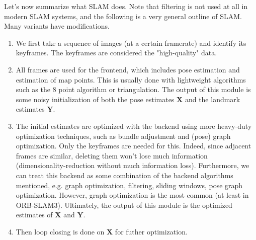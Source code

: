 \documentclass{article}
\newcounter{algo}[section]
\begin{document}
  Let's now summarize what SLAM does. Note that filtering is not used at all in modern SLAM systems, and the following is a very general outline of SLAM. Many variants have modifications. 
  \begin{enumerate}
      \item We first take a sequence of images (at a certain framerate) and identify its keyframes. The keyframes are considered the "high-quality" data. 
      \item All frames are used for the frontend, which includes pose estimation and estimation of map points. This is usually done with lightweight algorithms such as the 8 point algorithm or triangulation. The output of this module is some noisy initialization of both the pose estimates $\mathbf{X}$ and the landmark estimates $\mathbf{Y}$. 
      \item The initial estimates are optimized with the backend using more heavy-duty optimization techniques, such as bundle adjustment and (pose) graph optimization. Only the keyframes are needed for this. Indeed, since adjacent frames are similar, deleting them won't lose much information (dimensionality-reduction without much information loss). Furthermore, we can treat this backend as some combination of the backend algorithms mentioned, e.g. graph optimization, filtering, sliding windows, pose graph optimization. However, graph optimization is the most common (at least in ORB-SLAM3). Ultimately, the output of this module is the optimized estimates of $\mathbf{X}$ and $\mathbf{Y}$. 
      \item Then loop closing is done on $\mathbf{X}$ for futher optimization. 
  \end{enumerate}
\end{document}
